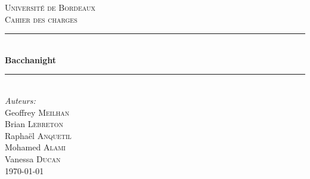 \documentclass[12pt]{article}
\begin{document}
\begin{titlepage}


\newcommand{\HRule}{\rule{\linewidth}{0.5mm}} %
\center %


\textsc{\LARGE Université de Bordeaux}\\[1.5cm] %
\textsc{\Large Cahier des charges}\\[0.5cm] %


\HRule \\[0.6cm]
{ \huge \bfseries Bacchanight}\\[0.4cm]
\HRule \\[1.5cm]


\Large \emph{Auteurs:}\\
Geoffrey \textsc{Meilhan}\\
Brian \textsc{Lebreton}\\
Raphaël \textsc{Anquetil}\\
Mohamed \textsc{Alami}\\
Vanessa \textsc{Ducan}\\[3cm]


{\large \today}\\[3cm] %
\vfill %

\end{titlepage}

\end{document}
